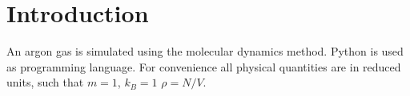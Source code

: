 \section{Introduction}
An argon gas is simulated using the molecular dynamics method. Python is used as programming language.
For convenience all physical quantities are in reduced units, such that $m=1$, $k_B=1$ $\rho=N/V$.